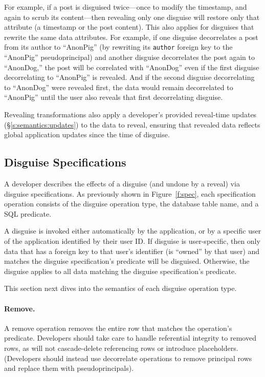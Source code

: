 %
For example, if a post is disguised twice---once to modify the timestamp, and
again to scrub its content---then revealing only one disguise will restore only
that attribute (\eg a timestamp or the post content). 
%
This also applies for disguises that rewrite the same data attributes. For
example, if one disguise decorrelates a post from its author to ``AnonPig''
(\ie by rewriting its \texttt{author} foreign key to the ``AnonPig''
pseudoprincipal) and another disguise decorrelates the post again to
``AnonDog,'' the post will be correlated with ``AnonDog'' even if the
first disguise decorrelating to ``AnonPig'' is revealed.
%
And if the second disguise decorrelating to ``AnonDog'' were revealed
first, the data would remain decorrelated to ``AnonPig'' until the user
also reveals that first decorrelating disguise.
%

%
Revealing transformations also apply a developer's provided reveal-time updates
(\S\ref{s:semantics:updates}) to the data to reveal, ensuring that revealed data
reflects global application updates since the time of disguise.
%

\subsection{Disguise Specifications}
\label{s:spec:semantics}

%
A developer describes the effects of a disguise (and undone by a
reveal) via disguise specifications.  As previously shown in
Figure~\ref{f:spec}, each specification operation consists of the disguise
operation type, the database table name, 
and a SQL  predicate.

%
A disguise is invoked either automatically by the application, or by a specific
user of the application identified by their user ID. 
% 
If disguise is user-specific, then only data that has a foreign key to that
user's identifier (is ``owned'' by that user) and matches the disguise
specification's predicate will be disguised.  Otherwise, the disguise applies to
all data matching the disguise specification's predicate.

This section next dives into the semantics of each disguise operation type.
%

\paragraph{Remove.}
A remove operation removes the entire row that matches the operation's
predicate.
%
Developers should take care to handle referential integrity to removed rows, as
\sys will not cascade-delete referencing rows or introduce placeholders.
(Developers should instead use decorrelate operations to remove principal
rows and replace them with pseudoprincipals).
%

